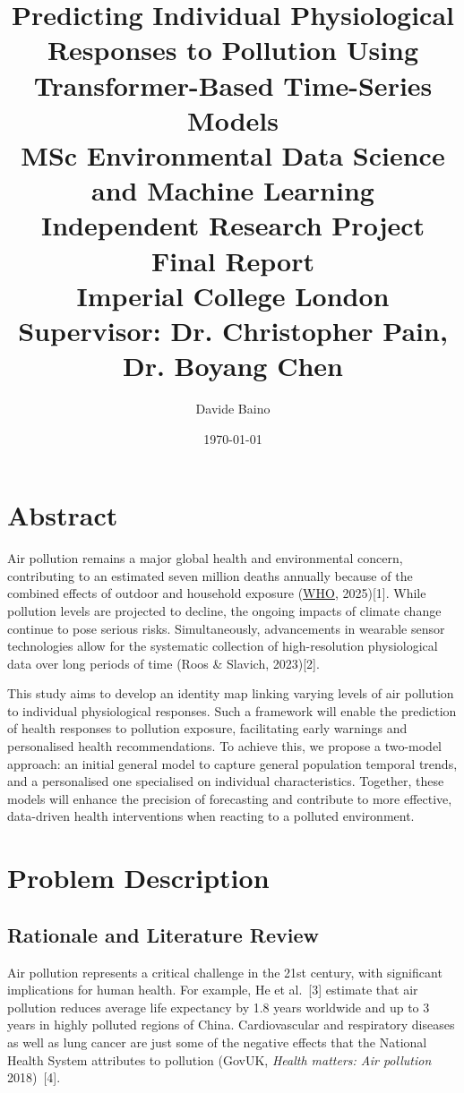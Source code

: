 \documentclass[12pt,a4paper]{report}
\title{
    \vspace{3cm}
    \textbf{Predicting Individual Physiological Responses to Pollution Using Transformer-Based Time-Series Models}\\[1cm]
    MSc Environmental Data Science and Machine Learning\\
    Independent Research Project Final Report\\[1cm]
    Imperial College London\\[2cm]
    Supervisor: Dr. Christopher Pain, Dr. Boyang Chen\\[2cm]
}
\author{Davide Baino}
\date{\today}
\begin{document}
\maketitle
\newpage

\tableofcontents
\newpage

\chapter{Abstract}
Air pollution remains a major global health and environmental concern,
contributing to an estimated seven million deaths annually because of
the combined effects of outdoor and household exposure
(\href{https://www.who.int/health-topics/air-pollution\#tab=tab_2}{WHO,}
2025){[}1{]}. While pollution levels are projected to decline, the
ongoing impacts of climate change continue to pose serious risks.
Simultaneously, advancements in wearable sensor technologies allow for
the systematic collection of high-resolution physiological data over
long periods of time (Roos \& Slavich, 2023){[}2{]}.

This study aims to develop an identity map linking varying levels of air
pollution to individual physiological responses. Such a framework will
enable the prediction of health responses to pollution exposure,
facilitating early warnings and personalised health recommendations. To
achieve this, we propose a two-model approach: an initial general model
to capture general population temporal trends, and a personalised one
specialised on individual characteristics. Together, these models will
enhance the precision of forecasting and contribute to more effective,
data-driven health interventions when reacting to a polluted
environment.

\chapter{Problem Description}
\section{Rationale and Literature Review}
Air pollution represents a critical challenge in the 21st century, with
significant implications for human health. For example, He et al.~[3]
estimate that air pollution reduces average life expectancy by 1.8 years
worldwide and up to 3 years in highly polluted regions of China.
Cardiovascular and respiratory diseases as well as lung cancer are just
some of the negative effects that the National Health System attributes
to pollution (GovUK, \emph{Health matters: Air pollution} 2018)~[4].
\end{document}
